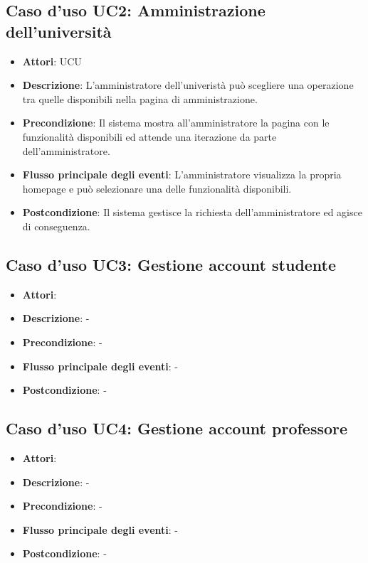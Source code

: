 \subsection{Caso d'uso \hypertarget{UC2}{UC2}: Amministrazione dell'università}
\begin{itemize}
\item \textbf{Attori}: UCU
\item \textbf{Descrizione}: L'amministratore dell'univeristà può scegliere una operazione tra quelle disponibili nella pagina di amministrazione.
\item \textbf{Precondizione}: Il sistema mostra all'amministratore la pagina con le funzionalità disponibili ed attende una iterazione da parte dell'amministratore.
\item \textbf{Flusso principale degli eventi}: L'amministratore visualizza la propria homepage e può selezionare una delle funzionalità disponibili.
\item \textbf{Postcondizione}: Il sistema gestisce la richiesta dell'amministratore ed agisce di conseguenza.
\end{itemize}
\subsection{Caso d'uso \hypertarget{UC3}{UC3}: Gestione account studente}
\begin{itemize}
\item \textbf{Attori}: 
\item \textbf{Descrizione}: -
\item \textbf{Precondizione}: -
\item \textbf{Flusso principale degli eventi}: -
\item \textbf{Postcondizione}: -
\end{itemize}
\subsection{Caso d'uso \hypertarget{UC4}{UC4}: Gestione account professore}
\begin{itemize}
\item \textbf{Attori}: 
\item \textbf{Descrizione}: -
\item \textbf{Precondizione}: -
\item \textbf{Flusso principale degli eventi}: -
\item \textbf{Postcondizione}: -
\end{itemize}

